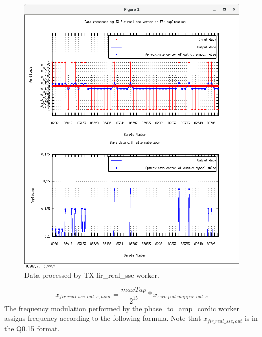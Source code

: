 	\begin{figure}[ht]
	 	\centering
	 	\begin{minipage}{0.7\textwidth}
			\centering\includegraphics[trim=0.5cm 1cm 1cm 1.5cm,clip,width=1.0\linewidth]{fir_real_sse_data}
			\caption{Data processed by TX fir\_real\_sse worker.}
			\label{fig:tx_fir_data}
		\end{minipage}
	\end{figure}

	\begin{equation} \label{eq:fir_out_val}
		x_{fir\_real\_sse,out,s,nom} = \frac{maxTap}{2^{15}} * x_{zero\_pad\_mapper,out,s}
	\end{equation}
The frequency modulation performed by the phase\_to\_amp\_cordic worker assigns frequency according to the following formula. Note that $x_{fir\_real\_sse,out}$ is in the Q0.15 format.

